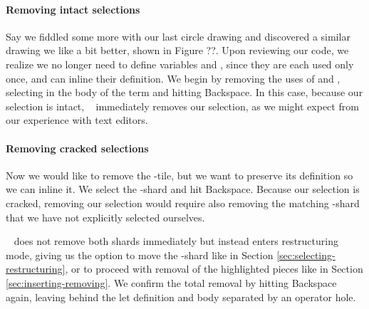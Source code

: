 \paragraph{Removing intact selections}
Say we fiddled some more with our last circle drawing
and discovered a similar drawing we like a bit better,
shown in Figure ??.
Upon reviewing our code, we realize we no longer
need to define variables  and ,
since they are each used only once, and can inline
their definition.
We begin by removing the uses of  and ,
selecting  in the body of the 
term and hitting Backspace.
In this case, because our selection is intact, \tylr~
immediately removes our selection, as we might
expect from our experience with text editors.

\paragraph{Removing cracked selections}
Now we would like to remove the -tile,
but we want to preserve its definition so we
can inline it.
We select the -shard and hit Backspace.
Because our selection is cracked, removing
our selection would require also removing the
matching -shard that we have not
explicitly selected ourselves.

\tylr~ does not remove both shards immediately but
instead enters restructuring mode, giving us the option
to move the -shard like in Section \ref{sec:selecting-restructuring},
or to proceed with removal of the highlighted pieces
like in Section \ref{sec:inserting-removing}.
We confirm the total removal by hitting Backspace again,
leaving behind the let definition and body
separated by an operator hole.


